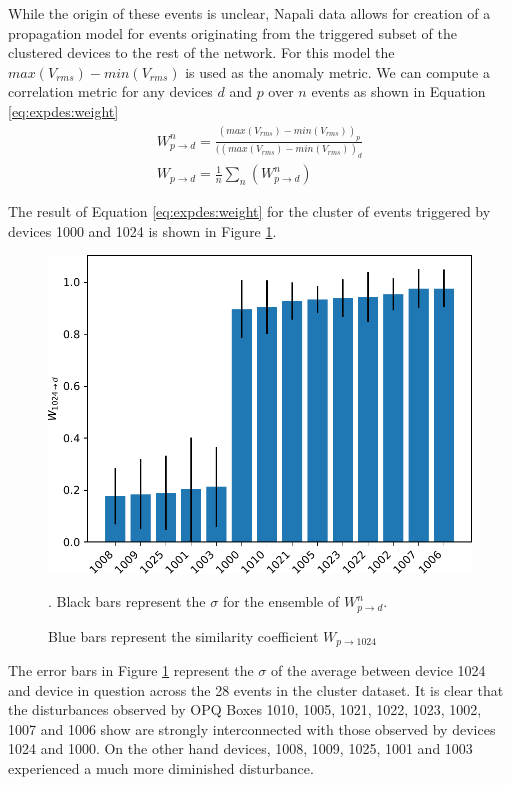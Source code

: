 While the origin of these events is unclear, Napali data allows for creation of a propagation model for events originating from the triggered subset of the clustered devices to the rest of the network.
For this model the $max(V_{rms}) - min(V_{rms})$ is used as the anomaly metric.
We can compute a correlation metric for any devices $d$ and $p$ over $n$ events as shown in Equation \ref{eq:expdes:weight}
\begin{equation} \label{eq:expdes:weight}
\begin{aligned}
    W^n_{p \rightarrow d} = \frac{(max(V_{rms}) - min(V_{rms}))_{p}}{((max(V_{rms}) - min(V_{rms}))_{d}} \\
    W_{p \rightarrow d} = \frac{1}{n}\sum_{n}(W^n_{p \rightarrow d})
\end{aligned}
\end{equation}

The result of Equation \ref{eq:expdes:weight} for the cluster of events triggered by devices 1000 and 1024 is shown in Figure \ref{fig:expdes:sub:fracto1024}.
\begin{figure}[ht!]
    \centering
    \includegraphics[width=0.8\linewidth]{img/napali_eval/subthreshold/clustering/1024toall.pdf}
    \caption{
    Blue bars represent the similarity coefficient $W_{p \rightarrow 1024}$}.
    Black bars represent the $\sigma$ for the ensemble of $W^n_{p \rightarrow d}$.
    \label{fig:expdes:sub:fracto1024}
\end{figure}

The error bars in Figure \ref{fig:expdes:sub:fracto1024} represent the $\sigma$ of the average between device 1024 and device in question across the 28 events in the cluster dataset.
It is clear that the disturbances observed by OPQ Boxes 1010, 1005, 1021, 1022, 1023, 1002, 1007 and 1006 show are strongly interconnected with those observed by devices 1024 and 1000.
On the other hand devices, 1008, 1009, 1025, 1001 and 1003 experienced a much more diminished disturbance.

